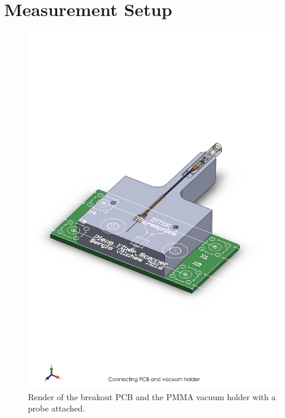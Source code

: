 \section{Measurement Setup}
\begin{figure}[h!]\centering \includegraphics[width=12cm]{appendix/holder.pdf}
      \caption{Render of the breakout PCB and the PMMA vacuum holder with a probe attached.}
\end{figure}

